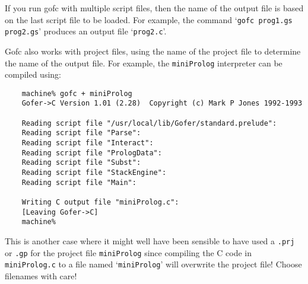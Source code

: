 If you run gofc with multiple script files, then the name of the output
file is based on the last script file to be loaded.  For example, the
command `\verb"gofc prog1.gs prog2.gs"' produces an output file `\verb"prog2.c"'.

Gofc also works with project files, using the name of the project file
to determine the name of the output file.  For example, the \verb"miniProlog"
interpreter can be compiled using:
\begin{verbatim}
    machine% gofc + miniProlog
    Gofer->C Version 1.01 (2.28)  Copyright (c) Mark P Jones 1992-1993

    Reading script file "/usr/local/lib/Gofer/standard.prelude":
    Reading script file "Parse":
    Reading script file "Interact":
    Reading script file "PrologData":
    Reading script file "Subst":
    Reading script file "StackEngine":
    Reading script file "Main":
                   
    Writing C output file "miniProlog.c":
    [Leaving Gofer->C]
    machine% 
\end{verbatim}
This is another case where it might well have been sensible to have
used a \verb".prj" or \verb".gp" for the project file \verb"miniProlog" since compiling the
C code in \verb"miniProlog.c" to a file named `\verb"miniProlog"' will overwrite the
project file!  Choose filenames with care!


